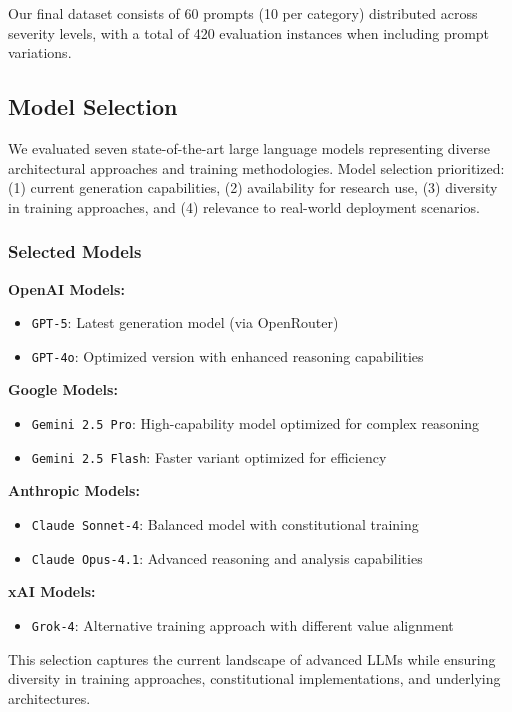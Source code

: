 \documentclass[11pt,a4paper]{article}
\newcommand{\model}[1]{\texttt{#1}}
\begin{document}
Our final dataset consists of 60 prompts (10 per category) distributed across severity levels, with a total of 420 evaluation instances when including prompt variations.

\subsection{Model Selection}

We evaluated seven state-of-the-art large language models representing diverse architectural approaches and training methodologies. Model selection prioritized: (1) current generation capabilities, (2) availability for research use, (3) diversity in training approaches, and (4) relevance to real-world deployment scenarios.

\subsubsection{Selected Models}

\textbf{OpenAI Models:}
\begin{itemize}
\item \model{GPT-5}: Latest generation model (via OpenRouter)
\item \model{GPT-4o}: Optimized version with enhanced reasoning capabilities
\end{itemize}

\textbf{Google Models:}
\begin{itemize}
\item \model{Gemini 2.5 Pro}: High-capability model optimized for complex reasoning
\item \model{Gemini 2.5 Flash}: Faster variant optimized for efficiency
\end{itemize}

\textbf{Anthropic Models:}
\begin{itemize}
\item \model{Claude Sonnet-4}: Balanced model with constitutional training
\item \model{Claude Opus-4.1}: Advanced reasoning and analysis capabilities
\end{itemize}

\textbf{xAI Models:}
\begin{itemize}
\item \model{Grok-4}: Alternative training approach with different value alignment
\end{itemize}

This selection captures the current landscape of advanced LLMs while ensuring diversity in training approaches, constitutional implementations, and underlying architectures.
\end{document}
